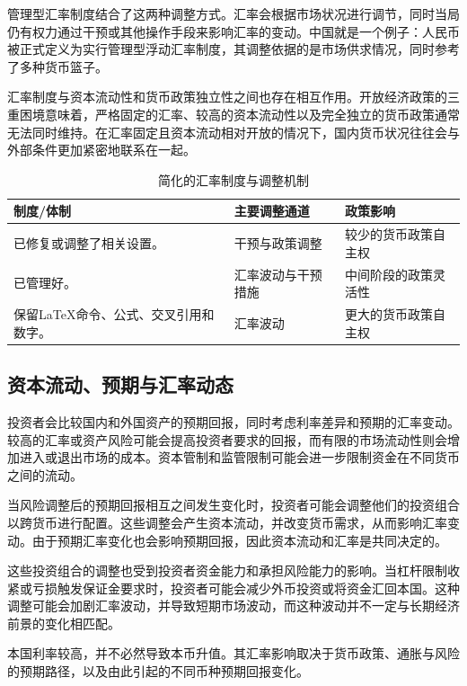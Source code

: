管理型汇率制度结合了这两种调整方式。汇率会根据市场状况进行调节，同时当局仍有权力通过干预或其他操作手段来影响汇率的变动。中国就是一个例子：人民币被正式定义为实行管理型浮动汇率制度，其调整依据的是市场供求情况，同时参考了多种货币篮子。

汇率制度与资本流动性和货币政策独立性之间也存在相互作用。开放经济政策的三重困境意味着，严格固定的汇率、较高的资本流动性以及完全独立的货币政策通常无法同时维持。在汇率固定且资本流动相对开放的情况下，国内货币状况往往会与外部条件更加紧密地联系在一起。

\begin{table}[H]
\centering
\caption{简化的汇率制度与调整机制}
\label{tab:ch10-exchange-rate-regimes}
\begin{tabularx}{\textwidth}{@{}p{2.7cm}X X@{}}
\toprule
\textbf{制度/体制}
& \textbf{主要调整通道}
& \textbf{政策影响} \\
\midrule
已修复或调整了相关设置。
& 干预与政策调整
& 较少的货币政策自主权 \\
已管理好。
& 汇率波动与干预措施
& 中间阶段的政策灵活性 \\
保留LaTeX命令、公式、交叉引用和数字。
& 汇率波动
& 更大的货币政策自主权 \\
\bottomrule
\end{tabularx}
\end{table}

\subsection{资本流动、预期与汇率动态}

投资者会比较国内和外国资产的预期回报，同时考虑利率差异和预期的汇率变动。较高的汇率或资产风险可能会提高投资者要求的回报，而有限的市场流动性则会增加进入或退出市场的成本。资本管制和监管限制可能会进一步限制资金在不同货币之间的流动。

当风险调整后的预期回报相互之间发生变化时，投资者可能会调整他们的投资组合以跨货币进行配置。这些调整会产生资本流动，并改变货币需求，从而影响汇率变动。由于预期汇率变化也会影响预期回报，因此资本流动和汇率是共同决定的。

这些投资组合的调整也受到投资者资金能力和承担风险能力的影响。当杠杆限制收紧或亏损触发保证金要求时，投资者可能会减少外币投资或将资金汇回本国。这种调整可能会加剧汇率波动，并导致短期市场波动，而这种波动并不一定与长期经济前景的变化相匹配。

\begin{tcolorbox}[
  enhanced,
  breakable,
  colback=white,
  colframe=FinanceBlue,
  boxrule=0.7pt,
  sharp corners,
  borderline west={2.2pt}{0pt}{FinanceBlue},
  title=\textbf{金融展望：利率和汇率},
  coltitle=white,
  colbacktitle=FinanceBlue,
  fonttitle=\bfseries,
  before skip=1.2em,
  after skip=1.2em
]

本国利率较高，并不必然导致本币升值。其汇率影响取决于货币政策、通胀与风险的预期路径，以及由此引起的不同币种预期回报变化。

\end{tcolorbox}


